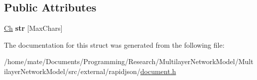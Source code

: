 \subsection*{Public Attributes}
\begin{DoxyCompactItemize}
\item 
\hyperlink{classGenericValue_ade0e0ce64ccd5d852da57a35e720bafb}{Ch} {\bfseries str} \mbox{[}Max\+Chars\mbox{]}\hypertarget{structGenericValue_1_1ShortString_a444e24523d4cc33830d18a2cfcfd333b}{}\label{structGenericValue_1_1ShortString_a444e24523d4cc33830d18a2cfcfd333b}

\end{DoxyCompactItemize}


The documentation for this struct was generated from the following file\+:\begin{DoxyCompactItemize}
\item 
/home/mate/\+Documents/\+Programming/\+Research/\+Multilayer\+Network\+Model/\+Multilayer\+Network\+Model/src/external/rapidjson/\hyperlink{document_8h}{document.\+h}\end{DoxyCompactItemize}
